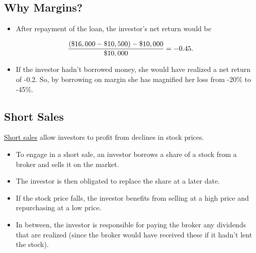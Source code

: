 \documentclass[letterpaper,10pt,english]{sphinxmanual}
\begin{document}
\subsection{Why Margins?}
\label{trading:id11}\begin{itemize}
\item {} 
After repayment of the loan, the investor's net return would be

\end{itemize}
\begin{gather}
\begin{split}\frac{(\$16,000 - \$10,500) - \$10,000}{\$10,000} = -0.45.\end{split}\notag
\end{gather}\begin{itemize}
\item {} 
If the investor hadn't borrowed money, she would have realized a net
return of -0.2. So, by borrowing on margin she has magnified her
loss from -20\% to -45\%.

\end{itemize}


\subsection{Short Sales}
\label{trading:short-sales}
\href{http://bit.ly/1bgEB8X}{Short sales} allow investors to profit from
declines in stock prices.
\begin{itemize}
\item {} 
To engage in a short sale, an investor borrows a share of a stock
from a broker and sells it on the market.

\end{itemize}
\begin{itemize}
\item {} 
The investor is then obligated to replace the share at a later date.

\end{itemize}
\begin{itemize}
\item {} 
If the stock price falls, the investor benefits from selling at a
high price and repurchasing at a low price.

\end{itemize}
\begin{itemize}
\item {} 
In between, the investor is responsible for paying the broker any
dividends that are realized (since the broker would have received
these if it hadn't lent the stock).

\end{itemize}
\end{document}
